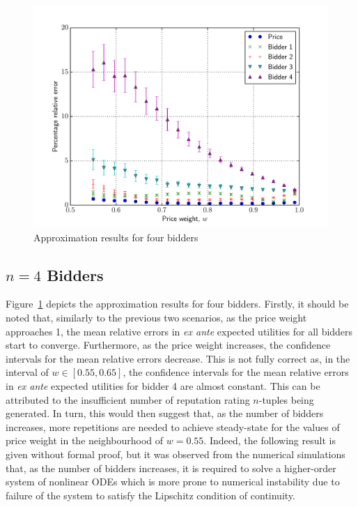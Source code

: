 \begin{figure}[t!]
  \includegraphics[width=\figsize]{Approximation/Figures/compare_4_bidders}
  \caption{Approximation results for four bidders}
  \label{fig:compare_4_bidders_approximation}
\end{figure}

\subsection{$n=4$ Bidders} %
\label{sub:n_4_bidders_approximation}
Figure~\ref{fig:compare_4_bidders_approximation} depicts the approximation results for four bidders. Firstly, it should be noted that, similarly to the previous two scenarios, as the price weight approaches 1, the mean relative errors in \emph{ex ante} expected utilities for all bidders start to converge. Furthermore, as the price weight increases, the confidence intervals for the mean relative errors decrease. This is not fully correct as, in the interval of $w\in [0.55, 0.65]$, the confidence intervals for the mean relative errors in \emph{ex ante} expected utilities for bidder 4 are almost constant. This can be attributed to the insufficient number of reputation rating $n$-tuples being generated. In turn, this would then suggest that, as the number of bidders increases, more repetitions are needed to achieve steady-state for the values of price weight in the neighbourhood of $w=0.55$. Indeed, the following result is given without formal proof, but it was observed from the numerical simulations that, as the number of bidders increases, it is required to solve a higher-order system of nonlinear ODEs which is more prone to numerical instability due to failure of the system to satisfy the Lipschitz condition of continuity.

